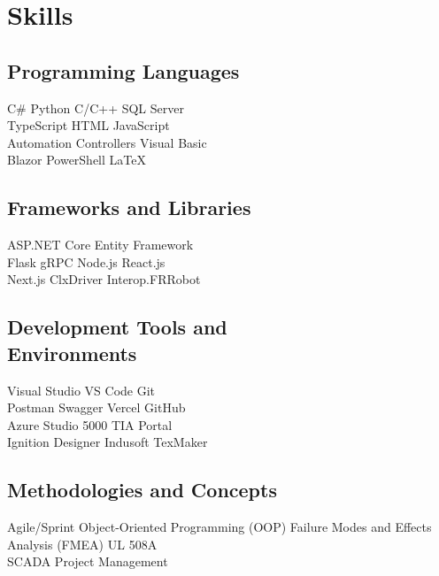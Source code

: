 \documentclass{TaylorTurnerResume2023}
\begin{document}
\hfill
\begin{minipage}[t]{0.275\textwidth} 

\section{Skills}

\subsection{Programming Languages}
  \textbullet{} C\#
  \textbullet{} Python
  \textbullet{} C/C++
  \textbullet{} SQL Server \\
  \textbullet{} TypeScript
  \textbullet{} HTML
  \textbullet{} JavaScript \\
  \textbullet{} Automation Controllers
  \textbullet{} Visual Basic \\
  \textbullet{} Blazor 
  \textbullet{} PowerShell
  \textbullet{} \LaTeX
\sectionsep
\subsection{Frameworks and Libraries}
  \textbullet{} ASP.NET Core
  \textbullet{} Entity Framework \\
  \textbullet{} Flask
  \textbullet{} gRPC
  \textbullet{} Node.js
  \textbullet{} React.js \\
  \textbullet{} Next.js
  \textbullet{} ClxDriver
  \textbullet{} Interop.FRRobot
\sectionsep
\subsection{Development Tools and \\ Environments}
  \textbullet{} Visual Studio
  \textbullet{} VS Code
  \textbullet{} Git \\
  \textbullet{} Postman
  \textbullet{} Swagger
  \textbullet{} Vercel
  \textbullet{} GitHub \\
  \textbullet{} Azure
  \textbullet{} Studio 5000
  \textbullet{} TIA Portal \\
  \textbullet{} Ignition Designer
  \textbullet{} Indusoft
  \textbullet{} TexMaker
\sectionsep
\subsection{Methodologies and Concepts}
  \textbullet{} Agile/Sprint
  \textbullet{} Object-Oriented Programming (OOP)
  \textbullet{} Failure Modes and Effects Analysis (FMEA)
  \textbullet{} UL 508A \\
  \textbullet{} SCADA
  \textbullet{} Project Management
\sectionsep
\sectionsep

\end{minipage}
\end{document}
